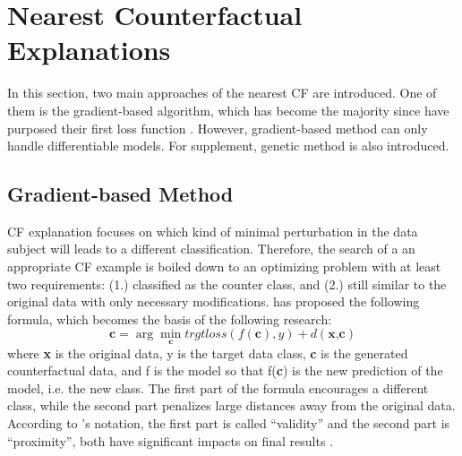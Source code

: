 \section{Nearest Counterfactual Explanations}\label{sec:generation}
In this section, two main approaches of the nearest CF are introduced. One of them is the gradient-based algorithm, which has become the majority since \citeauthor{watcher2017} \cite{watcher2017} have purposed their first loss function \cite{CFReview}. However, gradient-based method can only handle differentiable models. For supplement, genetic method is also introduced.

\subsection{Gradient-based Method}\label{sec:lossFunc}
CF explanation focuses on which kind of minimal perturbation in the data subject will leads to a different classification. Therefore, the search of a an appropriate CF example is boiled down to an optimizing problem with at least two requirements: (1.) classified as the counter class, and (2.) still similar to the original data with only necessary modifications. \citeauthor{watcher2017} \cite{watcher2017} has proposed the following formula, which becomes the basis of the following research:
\begin{equation}\label{eq:watcher}
  \textbf{c}=\arg\min_{\textbf{c}}trgtloss(f(\textbf{c}),y)+d(\textbf{x,c})
\end{equation}
where \textbf{x} is the original data, y is the target data class, \textbf{c} is the generated counterfactual data, and f is the model so that f(\textbf{c}) is the new prediction of the model, i.e. the new class. The first part of the formula encourages a different class, while the second part penalizes large distances away from the original data. According to \citeauthor{watcher2017}'s notation, the first part is called ``validity'' and the second part is ``proximity'', both have significant impacts on final results \cite{watcher2017}.

